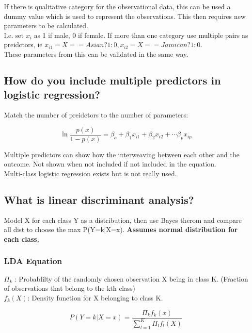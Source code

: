 \documentclass[11pt]{scrartcl} %
\begin{document}
If there is qualitative category for the observational data, this can be used a dummy value which is used to represent
the observations. This then requires new parameters to be calculated.\\

I.e. set \(x_i\) as 1 if male, 0 if female. If more than one category use multiple pairs as preidctors, ie 
\(x_{i1} = X==Asian?1:0, x_{i2} = X==Jamican?1:0\).\\

These parameters from this can be validated in the same way.

\subsection{How do you include multiple predictors in logistic regression?}

Match the number of preidctors to the number of parameters:

\begin{equation}
	\ln\frac{p(x)}{1-p(x)} = \beta_o + \beta_1x_{i1} + \beta_2x_{i2} + \cdots \beta_px_{ip}
\end{equation}

Multiple predictors can show how the interweaving between each other and the outcome. Not shown when not included if 
not included in the equation.\\

Multi-class logistic regression exists but is not really used.

\subsection{What is linear discriminant analysis?}

Model X for each class Y as a distribution, then use Bayes therom and compare all dist to choose the max P(Y=k|X=x).
\textbf{Assumes normal distribution for each class.}

\subsubsection{LDA Equation}

\(\Pi_k\) : Probablilty of the randomly chosen observation X being in class K. (Fraction of observations that belong to the kth class)\\

\(f_k(X)\): Density function for X belonging to class K.

\begin{equation}
	P(Y=k|X=x) = \frac{\Pi_kf_k(x)}{\sum^K_{l=1}{\Pi_lf_l(X)}}
\end{equation}
\end{document}
